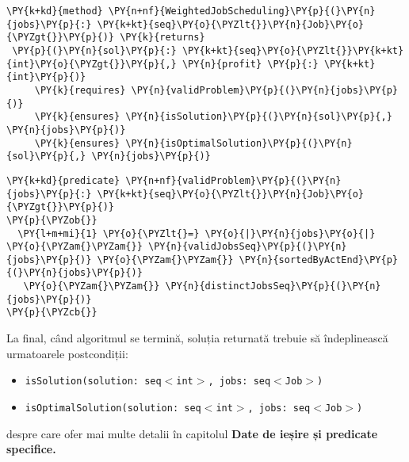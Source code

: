 \begin{Verbatim}[commandchars=\\\{\}, fontsize=\footnotesize]
\PY{k+kd}{method} \PY{n+nf}{WeightedJobScheduling}\PY{p}{(}\PY{n}{jobs}\PY{p}{:} \PY{k+kt}{seq}\PY{o}{\PYZlt{}}\PY{n}{Job}\PY{o}{\PYZgt{}}\PY{p}{)} \PY{k}{returns}
 \PY{p}{(}\PY{n}{sol}\PY{p}{:} \PY{k+kt}{seq}\PY{o}{\PYZlt{}}\PY{k+kt}{int}\PY{o}{\PYZgt{}}\PY{p}{,} \PY{n}{profit} \PY{p}{:} \PY{k+kt}{int}\PY{p}{)}
     \PY{k}{requires} \PY{n}{validProblem}\PY{p}{(}\PY{n}{jobs}\PY{p}{)}
     \PY{k}{ensures} \PY{n}{isSolution}\PY{p}{(}\PY{n}{sol}\PY{p}{,} \PY{n}{jobs}\PY{p}{)}
     \PY{k}{ensures} \PY{n}{isOptimalSolution}\PY{p}{(}\PY{n}{sol}\PY{p}{,} \PY{n}{jobs}\PY{p}{)}
\end{Verbatim}

\begin{Verbatim}[commandchars=\\\{\}, fontsize=\footnotesize]
 \PY{k+kd}{predicate} \PY{n+nf}{validProblem}\PY{p}{(}\PY{n}{jobs}\PY{p}{:} \PY{k+kt}{seq}\PY{o}{\PYZlt{}}\PY{n}{Job}\PY{o}{\PYZgt{}}\PY{p}{)}
\PY{p}{\PYZob{}}
  \PY{l+m+mi}{1} \PY{o}{\PYZlt{}=} \PY{o}{|}\PY{n}{jobs}\PY{o}{|} \PY{o}{\PYZam{}\PYZam{}} \PY{n}{validJobsSeq}\PY{p}{(}\PY{n}{jobs}\PY{p}{)} \PY{o}{\PYZam{}\PYZam{}} \PY{n}{sortedByActEnd}\PY{p}{(}\PY{n}{jobs}\PY{p}{)}
   \PY{o}{\PYZam{}\PYZam{}} \PY{n}{distinctJobsSeq}\PY{p}{(}\PY{n}{jobs}\PY{p}{)}
\PY{p}{\PYZcb{}}
\end{Verbatim}

La final, când algoritmul se termină, soluția returnată trebuie să îndeplinească urmatoarele postcondiții:
\begin{itemize}
    \item \texttt{isSolution(solution: seq$<$int$>$, jobs: seq$<$Job$>$)}
    
    \item \texttt{isOptimalSolution(solution: seq$<$int$>$, jobs: seq$<$Job$>$)}
\end{itemize}despre care ofer mai multe detalii în capitolul \textbf{Date de ieșire și predicate specifice.}\\

